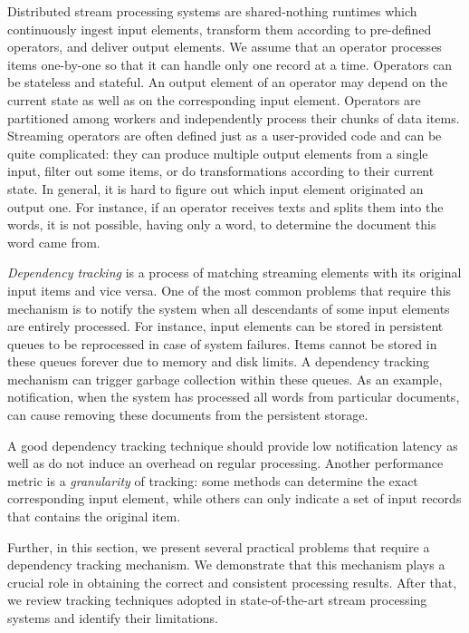 \label {fs-acker-motivation}

Distributed stream processing systems are shared-nothing runtimes which continuously ingest input elements, transform them according to pre-defined operators, and deliver output elements. We assume that an operator processes items one-by-one so that it can handle only one record at a time. Operators can be stateless and stateful. An output element of an operator may depend on the current state as well as on the corresponding input element. Operators are partitioned among workers and independently process their chunks of data items. Streaming operators are often defined just as a user-provided code and can be quite complicated: they can produce multiple output elements from a single input, filter out some items, or do transformations according to their current state. In general, it is hard to figure out which input element originated an output one. For instance, if an operator receives texts and splits them into the words, it is not possible, having only a word, to determine the document this word came from.

{\em Dependency tracking} is a process of matching streaming elements with its original input items and vice versa. One of the most common problems that require this mechanism is to notify the system when all descendants of some input elements are entirely processed. For instance, input elements can be stored in persistent queues to be reprocessed in case of system failures. Items cannot be stored in these queues forever due to memory and disk limits. A dependency tracking mechanism can trigger garbage collection within these queues. As an example, notification, when the system has processed all words from particular documents, can cause removing these documents from the persistent storage. 

A good dependency tracking technique should provide low notification latency as well as do not induce an overhead on regular processing. Another performance metric is a {\em granularity} of tracking: some methods can determine the exact corresponding input element, while others can only indicate a set of input records that contains the original item.

Further, in this section, we present several practical problems that require a dependency tracking mechanism. We demonstrate that this mechanism plays a crucial role in obtaining the correct and consistent processing results. After that, we review tracking techniques adopted in state-of-the-art stream processing systems and identify their limitations. 

